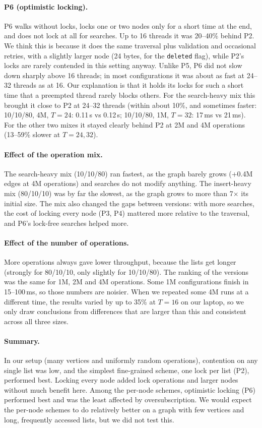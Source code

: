 \paragraph{P6 (optimistic locking).}
P6 walks without locks, locks one or two nodes only for a short time at the end, and does not lock at all for searches. Up to 16 threads it was 20--40\% behind P2.
We think this is because it does the same traversal plus validation and occasional retries, with a slightly larger node (24 bytes, for the \texttt{deleted} flag),
while P2's locks are rarely contended in this setting anyway. Unlike P5, P6 did not slow down sharply above 16 threads; in most configurations it was about as fast at 24--32 threads as at 16.
Our explanation is that it holds its locks for such a short time that a preempted thread rarely blocks others.
For the search-heavy mix this brought it close to P2 at 24--32 threads (within about 10\%, and sometimes faster: 10/10/80, 4M, $T=24$: 0.11\,s vs 0.12\,s;
10/10/80, 1M, $T=32$: 17\,ms vs 21\,ms). For the other two mixes it stayed clearly behind P2 at 2M and 4M operations (13--59\% slower at $T=24, 32$).

\paragraph{Effect of the operation mix.}
The search-heavy mix (10/10/80) ran fastest, as the graph barely grows (+0.4M edges at 4M operations) and searches do not modify anything.
The insert-heavy mix (80/10/10) was by far the slowest, as the graph grows to more than 7$\times$ its initial size.
The mix also changed the gaps between versions: with more searches, the cost of locking every node (P3, P4) mattered more relative to the traversal, and P6's lock-free searches helped more.

\paragraph{Effect of the number of operations.}
More operations always gave lower throughput, because the lists get longer (strongly for 80/10/10, only slightly for 10/10/80). The ranking of the versions was the same for 1M, 2M and 4M operations.
Some 1M configurations finish in 15--100\,ms, so those numbers are noisier. When we repeated some 4M runs at a different time,
the results varied by up to 35\% at $T=16$ on our laptop, so we only draw conclusions from differences that are larger than this and consistent across all three sizes.

\paragraph{Summary.}
In our setup (many vertices and uniformly random operations), contention on any single list was low, and the simplest fine-grained scheme, one lock per list (P2), performed best.
Locking every node added lock operations and larger nodes without much benefit here. Among the per-node schemes, optimistic locking (P6) performed best and was the least affected by oversubscription.
We would expect the per-node schemes to do relatively better on a graph with few vertices and long, frequently accessed lists, but we did not test this.
